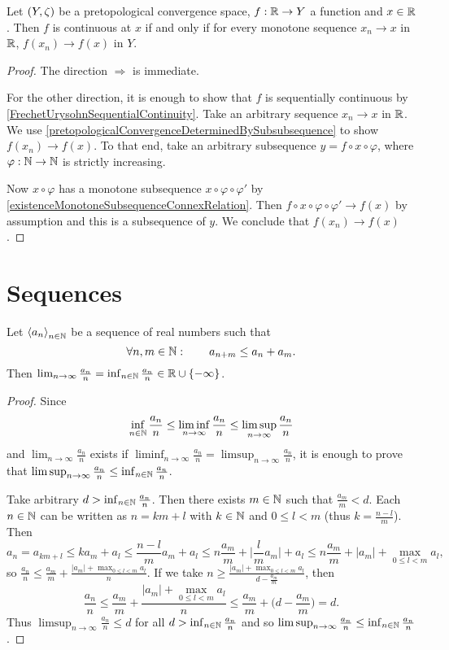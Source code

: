 \begin{lemma} \label{monotoneContinuityImpliesContinuityRealDomain}
Let $\sSet{Y,\zeta}$ be a pretopological convergence space, $f: \mathbb{R}\to Y$ a function and $x\in \mathbb{R}$. Then $f$ is continuous at $x$ \textup{if and only if} for every monotone sequence $x_n\to x$ in $\mathbb{R}$, $f(x_n) \to f(x)$ in $Y$.
\end{lemma}
\begin{proof}
The direction $\Rightarrow$ is immediate.

For the other direction, it is enough to show that $f$ is sequentially continuous by \ref{FrechetUrysohnSequentialContinuity}. Take an arbitrary sequence $x_n\to x$ in $\mathbb{R}$. We use \ref{pretopologicalConvergenceDeterminedBySubsubsequence} to show $f(x_n) \to f(x)$. To that end, take an arbitrary subsequence $y = f\circ x\circ \varphi$, where $\varphi:\mathbb{N}\to \mathbb{N}$ is strictly increasing.

Now $x\circ \varphi$ has a monotone subsequence $x\circ \varphi\circ \varphi'$ by \ref{existenceMonotoneSubsequenceConnexRelation}. Then $f\circ x\circ \varphi\circ \varphi' \to f(x)$ by assumption and this is a subsequence of $y$. We conclude that $f(x_n) \to f(x)$.
\end{proof}

\section{Sequences}

\begin{proposition} \label{FeketesLemma}
Let $\left\langle a_n \right\rangle_{n\in \mathbb{N}}$ be a sequence of real numbers such that
\[ \forall n,m\in \mathbb{N}: \qquad a_{n+m} \leq a_n+a_m. \]
Then $\lim_{n\to \infty} \frac{a_n}{n} = \inf_{n\in\mathbb{N}}\frac{a_n}{n} \in \mathbb{R}\cup\{-\infty\}$.
\end{proposition}
\begin{proof}
Since
\[ \inf_{n\in\mathbb{N}}\frac{a_n}{n} \leq \liminf_{n\to\infty}\frac{a_n}{n} \leq \limsup_{n\to\infty}\frac{a_n}{n} \]
and $\lim_{n\to \infty} \frac{a_n}{n}$ exists if $\liminf_{n\to\infty}\frac{a_n}{n} = \limsup_{n\to\infty}\frac{a_n}{n}$, it is enough to prove that $\limsup_{n\to\infty}\frac{a_n}{n} \leq \inf_{n\in\mathbb{N}}\frac{a_n}{n}$.

Take arbitrary $d > \inf_{n\in\mathbb{N}}\frac{a_n}{n}$. Then there exists $m\in\mathbb{N}$ such that $\frac{a_m}{m} < d$. Each $n\in \mathbb{N}$ can be written as $n = km+l$ with $k\in \mathbb{N}$ and $0\leq l < m$ (thus $k = \frac{n-l}{m}$). Then
\[ a_n = a_{km+l} \leq ka_m + a_l \leq \frac{n-l}{m}a_m + a_l \leq n\frac{a_m}{m} + \Big|\frac{l}{m}a_m\Big| + a_l \leq n\frac{a_m}{m} + |a_m| + \max_{0\leq l < m}a_l, \]
so $\frac{a_n}{n}\leq \frac{a_m}{m} + \frac{|a_m| + \max_{0\leq l < m}a_l}{n}$. If we take $n \geq \frac{|a_m| + \max_{0\leq l < m}a_l}{d - \frac{a_m}{m}}$, then
\[ \frac{a_n}{n}\leq \frac{a_m}{m} + \frac{|a_m| + \max_{0\leq l < m}a_l}{n} \leq \frac{a_m}{m} + \Big(d - \frac{a_m}{m}\Big) = d. \]
Thus $\limsup_{n\to\infty}\frac{a_n}{n} \leq d$ for all $d> \inf_{n\in\mathbb{N}}\frac{a_n}{n}$ and so $\limsup_{n\to\infty}\frac{a_n}{n} \leq \inf_{n\in\mathbb{N}}\frac{a_n}{n}$.
\end{proof}

